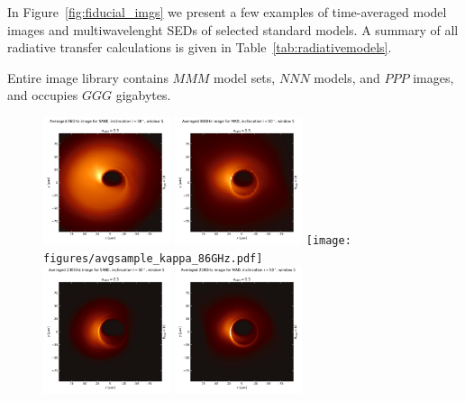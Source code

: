 In Figure~\ref{fig:fiducial_imgs} we present a few examples of time-averaged model images and multiwavelenght SEDs of selected standard \sgra models. A summary of all radiative transfer calculations is given in Table~\ref{tab:radiativemodels}.

Entire image library contains $MMM$ model sets, $NNN$ models, and $PPP$ images, and occupies $GGG$ gigabytes.

\begin{figure}
  \centering
  \includegraphics[width=0.333\textwidth]{figures/avgsample_SANE_86GHz.pdf}%
  \includegraphics[width=0.333\textwidth]{figures/avgsample_MAD_86GHz.pdf}%
  \texttt{[image: figures/avgsample\_kappa\_86GHz.pdf]}\\
  \includegraphics[width=0.333\textwidth]{figures/avgsample_SANE.pdf}%
  \includegraphics[width=0.333\textwidth]{figures/avgsample_MAD.pdf}%

\end{figure}
